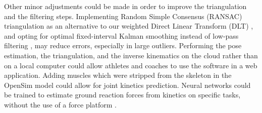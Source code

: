 Other minor adjustments could be made in order to improve the triangulation and the filtering steps. Implementing Random Simple Consensus (RANSAC) triangulation \cite{Fischler1981} as an alternative to our weighted Direct Linear Transform (DLT) \cite{Pagnon2021}, and opting for optimal fixed-interval Kalman smoothing instead of low-pass filtering \cite{Rauch1965,Needham2021a}, may reduce errors, especially in large outliers. Performing the pose estimation, the triangulation, and the inverse kinematics on the cloud rather than on a local computer could allow athletes and coaches to use the software in a web application. Adding muscles which were stripped from the skeleton in the OpenSim model could allow for joint kinetics prediction. Neural networks could be trained to estimate ground reaction forces from kinetics on specific tasks, without the use of a force platform \cite{Oh2013,Johnson2018,Mundt2019}.
